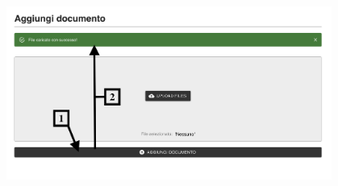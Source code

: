 \begin{center}
    \includegraphics[width=0.8\textwidth]{./img/GestioneDocumenti5.png}
    \label{fig:gestione4}
\end{center}

